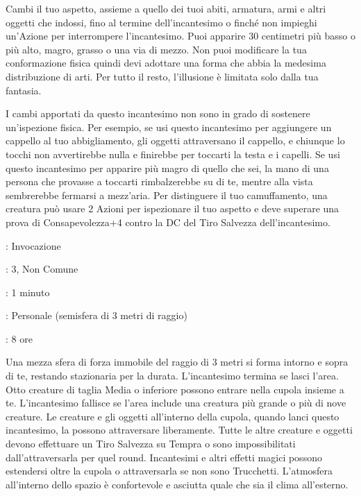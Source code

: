 \begin{multicols}{2}
Cambi il tuo aspetto, assieme a quello dei tuoi abiti, armatura, armi e altri oggetti che indossi, fino al termine dell'incantesimo o finché non impieghi un'Azione per interrompere l'incantesimo. Puoi apparire 30 centimetri più basso o più alto, magro, grasso o una via di mezzo. Non puoi modificare la tua conformazione fisica quindi devi adottare una forma che abbia la medesima distribuzione di arti. Per tutto il resto, l'illusione è limitata solo dalla tua fantasia.

I cambi apportati da questo incantesimo non sono in grado di sostenere un'ispezione fisica. Per esempio, se usi questo incantesimo per aggiungere un cappello al tuo abbigliamento, gli oggetti attraversano il cappello, e chiunque lo tocchi non avvertirebbe nulla e finirebbe per toccarti la testa e i capelli. Se usi questo incantesimo per apparire più magro di quello che sei, la mano di una persona che provasse a toccarti rimbalzerebbe su di te, mentre alla vista sembrerebbe fermarsi a mezz'aria. Per distinguere il tuo camuffamento, una creatura può usare 2 Azioni per ispezionare il tuo aspetto e deve superare una prova di Consapevolezza+4 contro la DC del Tiro Salvezza dell'incantesimo.

\noindent\colorbox{OBSSgold!10}{
\begin{minipage}{0.95\linewidth}
\begin{description}[noitemsep, topsep=0pt, parsep=0pt, partopsep=0pt, leftmargin=0cm, labelwidth=1.3cm]
	\item[\textbf{Lista}]: Invocazione
	\item[\textbf{Livello}]: 3, Non Comune
	\item[\textbf{Lancio}]: 1 minuto
	\item[\textbf{Gittata}]: Personale (semisfera di 3 metri di raggio)
	\item[\textbf{Durata}]: 8 ore
\end{description}
\end{minipage}}\smallskip

Una mezza sfera di forza immobile del raggio di 3 metri si forma intorno e sopra di te, restando stazionaria per la durata. L'incantesimo termina se lasci l'area. Otto creature di taglia Media o inferiore possono entrare nella cupola insieme a te. L'incantesimo fallisce se l'area include una creatura più grande o più di nove creature. Le creature e gli oggetti all'interno della cupola, quando lanci questo incantesimo, la possono attraversare liberamente. Tutte le altre creature e oggetti devono effettuare un Tiro Salvezza su Tempra o sono impossibilitati dall'attraversarla per quel round. Incantesimi e altri effetti magici possono estendersi oltre la cupola o attraversarla se non sono Trucchetti. L'atmosfera all'interno dello spazio è confortevole e asciutta quale che sia il clima all'esterno.


\end{multicols}
